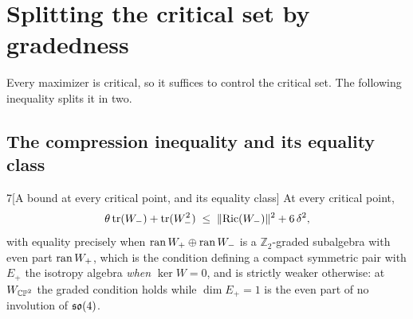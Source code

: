 \section{Splitting the critical set by gradedness}\label{sec:split}

Every maximizer is critical, so it suffices to control the critical set. The following inequality splits it in two.

\subsection{The compression inequality and its equality class}\label{sec:compression}

\begin{Lem}{7}[A bound at every critical point, and its equality class]
At every critical point,
\[
\theta\operatorname{tr}(W_-)+\operatorname{tr}(W_-^2)\;\le\;\|\mathrm{Ric}(W_-)\|^2+6\,\delta^2 ,
\]
with equality precisely when $\operatorname{ran} W_+\oplus\operatorname{ran} W_-$ is a $\mathbb Z_2$-graded subalgebra with even part $\operatorname{ran} W_+$, which is the condition defining a compact symmetric pair with $E_+$ the isotropy algebra \emph{when} $\ker W=0$, and is strictly weaker otherwise: at $W_{\mathbb{CP}^2}$ the graded condition holds while $\dim E_+=1$ is the even part of no involution of $\mathfrak{so}(4)$.
\end{Lem}

